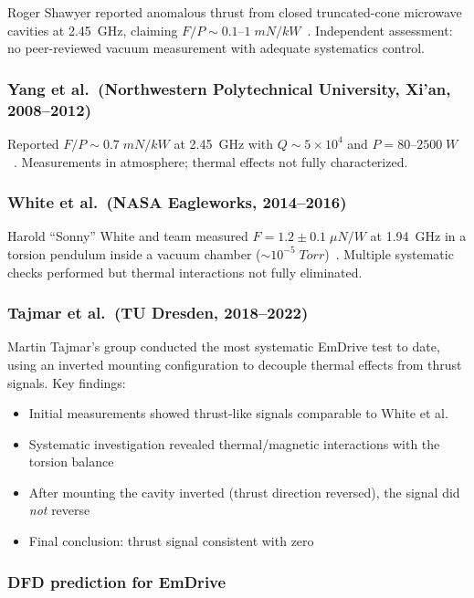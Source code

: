 \documentclass[aps,prd,twocolumn,superscriptaddress,floatfix,nofootinbib]{revtex4-2}
\begin{document}
Roger Shawyer reported anomalous thrust from closed truncated-cone
microwave cavities at 2.45~GHz, claiming
$F/P \sim 0.1$--$1\;\si{mN/kW}$~\cite{Shawyer2006}.
Independent assessment: no peer-reviewed vacuum measurement with
adequate systematics control.

\subsubsection{Yang et al.\ (Northwestern Polytechnical University,
Xi'an, 2008--2012)}

Reported $F/P \sim 0.7\;\si{mN/kW}$ at 2.45~GHz with $Q \sim 5\times10^4$
and $P = 80$--$2500\;\si{W}$~\cite{Yang2013}. Measurements in
atmosphere; thermal effects not fully characterized.

\subsubsection{White et al.\ (NASA Eagleworks, 2014--2016)}

Harold ``Sonny'' White and team measured
$F = 1.2 \pm 0.1\;\si{\mu N/W}$ at 1.94~GHz in a torsion pendulum
inside a vacuum chamber ($\sim 10^{-5}\;\si{Torr}$)~\cite{White2017}.
Multiple systematic checks performed but thermal interactions not fully
eliminated.

\subsubsection{Tajmar et al.\ (TU Dresden, 2018--2022)}

Martin Tajmar's group conducted the most systematic EmDrive test
to date, using an inverted mounting configuration to decouple
thermal effects from thrust signals. Key findings:
\begin{itemize}[nosep]
\item Initial measurements showed thrust-like signals comparable
to White et al.
\item Systematic investigation revealed thermal/magnetic interactions
with the torsion balance
\item After mounting the cavity inverted (thrust direction reversed),
the signal did \emph{not} reverse
\item Final conclusion: thrust signal consistent with
zero~\cite{Tajmar2021EmDrive}
\end{itemize}

\subsubsection{DFD prediction for EmDrive}
\end{document}
